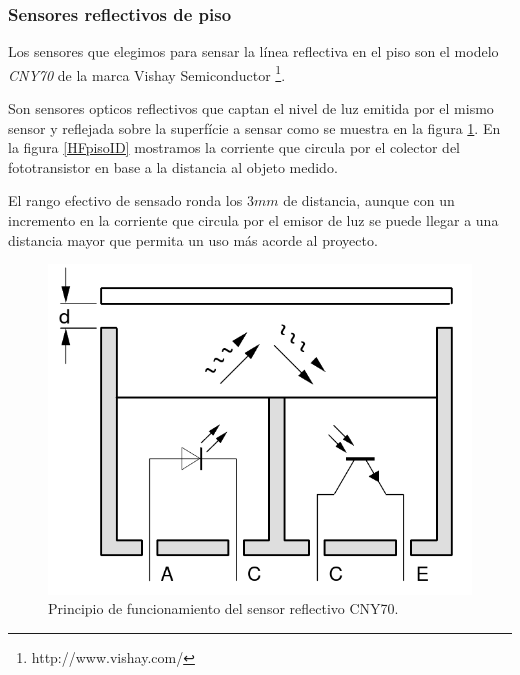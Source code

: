 \subsubsection{Sensores reflectivos de piso}
\label{Hpiso}

Los sensores que elegimos para sensar la l\'inea reflectiva en el piso son el modelo \emph{CNY70} de la marca Vishay Semiconductor
\footnote{http://www.vishay.com/}.

Son sensores opticos reflectivos que captan el nivel de luz emitida por el mismo sensor y reflejada sobre la superf\'icie a sensar
como se muestra en la figura \ref{HFpiso}. En la figura \ref{HFpisoID} mostramos la corriente que circula por el colector del
fototransistor en base a la distancia al objeto medido.

El rango efectivo de sensado ronda los $3 mm$ de distancia, aunque con un incremento en la corriente que circula por el emisor de luz
se puede llegar a una distancia mayor que permita un uso m\'as acorde al proyecto.

\begin{figure}[ht]
	\centering
	\includegraphics[scale=0.15]{piso.png}
	\caption{Principio de funcionamiento del sensor reflectivo CNY70.}
	\label{HFpiso}
\end{figure}


